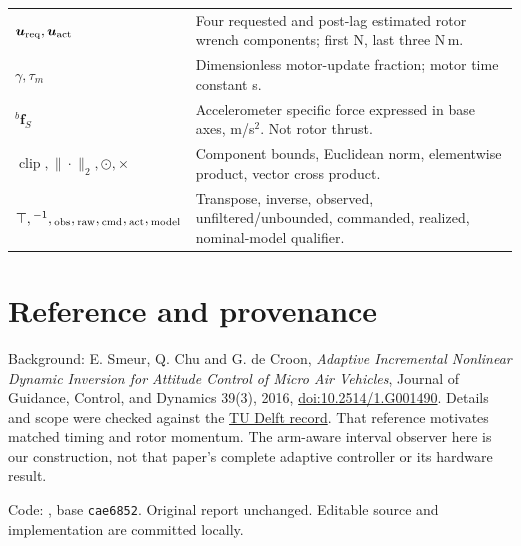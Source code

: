 \documentclass[11pt,a4paper]{article}
\newcommand{\vct}[1]{\boldsymbol{#1}}
\newcommand{\bv}[1]{{}^{b}\vct{#1}}
\begin{document}
\begin{longtable}{L{4.2cm}L{10.5cm}}
$\vct u_{\rm req},\vct u_{\rm act}$ & Four requested and post-lag estimated rotor wrench components; first N, last three N\,m.\\
$\gamma,\tau_m$ & Dimensionless motor-update fraction; motor time constant s.\\
$\bv f_S$ & Accelerometer specific force expressed in base axes, m/s$^2$. Not rotor thrust.\\
$\operatorname{clip},\|\cdot\|_2,\odot,\times$ & Component bounds, Euclidean norm, elementwise product, vector cross product.\\
$\top,{}^{-1},{}_{\rm obs},{}_{\rm raw},{}_{\rm cmd},{}_{\rm act},{}_{\rm model}$ & Transpose, inverse, observed, unfiltered/unbounded, commanded, realized, nominal-model qualifier.\\\bottomrule
\end{longtable}
\normalsize

\section*{Reference and provenance}
\begingroup\small\raggedright
Background: E. Smeur, Q. Chu and G. de Croon,
\emph{Adaptive Incremental Nonlinear Dynamic Inversion for Attitude Control of
Micro Air Vehicles}, Journal of Guidance, Control, and Dynamics 39(3), 2016,
\href{https://doi.org/10.2514/1.G001490}{doi:10.2514/1.G001490}.
Details and scope were checked against the
\href{https://research.tudelft.nl/en/publications/adaptive-incremental-nonlinear-dynamic-inversion-for-attitude-con-2/}{TU Delft record}.
That reference motivates matched timing and rotor momentum. The arm-aware
interval observer here is our construction, not that paper's complete adaptive
controller or its hardware result.\par
Code: , base \texttt{cae6852}.
Original report unchanged. Editable source and implementation are committed locally.\par
\endgroup
\end{document}
